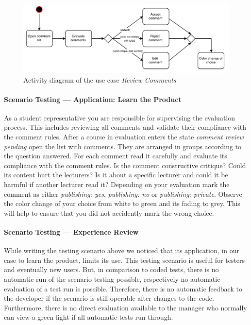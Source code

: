 \begin{figure}[h]
    \centering
    \includegraphics[width=\textwidth, keepaspectratio]{graphics/use-case}
    \caption{Activity diagram of the use case \emph{Review Comments}} %
    \label{fig:activity-diagram}
\end{figure}

\paragraph{Scenario Testing --- Application: Learn the Product}
As a student representative you are responsible for supervising the evaluation process.
This includes reviewing all comments and validate their compliance with the comment rules.
After a course in evaluation enters the state \emph{comment review pending} open the list with comments.
They are arranged in groups according to the question answered.
For each comment read it carefully and evaluate its compliance with the comment rules.
Is the comment constructive critique? 
Could its content hurt the lecturers? 
Is it about a specific lecturer and could it be harmful if another lecturer read it?
Depending on your evaluation mark the comment as either \emph{publishing: yes}, \emph{publishing: no} or \emph{publishing: private}.
Observe the color change of your choice from white to green and its fading to grey.
This will help to ensure that you did not accidently mark the wrong choice.

\paragraph{Scenario Testing --- Experience Review}
While writing the testing scenario above we noticed that its application, in our case to learn the product, limits its use.
This testing scenario is useful for testers and eventually new users.
But, in comparison to coded tests, there is no automatic run of the scenario testing possible, respectively no automatic evaluation of a test run is possible.
Therefore, there is no automatic feedback to the developer if the scenario is still operable after changes to the code.
Furthermore, there is no direct evaluation available to the manager who normally can view a green light if all automatic tests run through.

